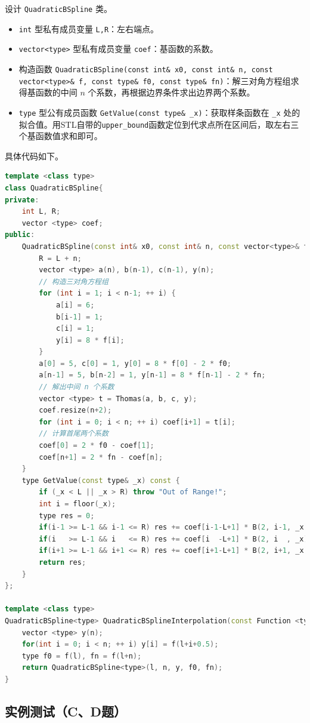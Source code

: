 \documentclass{ctexart}
\begin{document}
设计 \verb|QuadraticBSpline| 类。

\begin{itemize}
\item \verb|int| 型私有成员变量 \verb|L,R|：左右端点。
\item \verb|vector<type>| 型私有成员变量 \verb|coef|：基函数的系数。
\item 构造函数 \verb|QuadraticBSpline(const int& x0, const int& n, const vector<type>& f, const type& f0, const type& fn)|：解三对角方程组求得基函数的中间 $n$ 个系数，再根据边界条件求出边界两个系数。
\item \verb|type| 型公有成员函数 \verb|GetValue(const type& _x)|：获取样条函数在 \verb|_x| 处的拟合值。用STL自带的\verb|upper_bound|函数定位到代求点所在区间后，取左右三个基函数值求和即可。
\end{itemize}

具体代码如下。

\begin{lstlisting}[language={c++}]
template <class type>
class QuadraticBSpline{
private:
	int L, R;
	vector <type> coef;
public:
	QuadraticBSpline(const int& x0, const int& n, const vector<type>& f, const type& f0, const type& fn) : L(x0) {
		R = L + n;
		vector <type> a(n), b(n-1), c(n-1), y(n);
		// 构造三对角方程组
		for (int i = 1; i < n-1; ++ i) {
			a[i] = 6;
			b[i-1] = 1;
			c[i] = 1;
			y[i] = 8 * f[i];
		}
		a[0] = 5, c[0] = 1, y[0] = 8 * f[0] - 2 * f0;
		a[n-1] = 5, b[n-2] = 1, y[n-1] = 8 * f[n-1] - 2 * fn;
		// 解出中间 n 个系数
		vector <type> t = Thomas(a, b, c, y);
		coef.resize(n+2);
		for (int i = 0; i < n; ++ i) coef[i+1] = t[i];
		// 计算首尾两个系数
		coef[0] = 2 * f0 - coef[1];
		coef[n+1] = 2 * fn - coef[n];
	}
	type GetValue(const type& _x) const {
		if (_x < L || _x > R) throw "Out of Range!";
		int i = floor(_x);
		type res = 0;
		if(i-1 >= L-1 && i-1 <= R) res += coef[i-1-L+1] * B(2, i-1, _x);
		if(i   >= L-1 && i   <= R) res += coef[i  -L+1] * B(2, i  , _x);
		if(i+1 >= L-1 && i+1 <= R) res += coef[i+1-L+1] * B(2, i+1, _x);
		return res;
	}
};

template <class type>
QuadraticBSpline<type> QuadraticBSplineInterpolation(const Function <type>& f, const int& l, const int& n) {
	vector <type> y(n);
	for(int i = 0; i < n; ++ i) y[i] = f(l+i+0.5);
	type f0 = f(l), fn = f(l+n);
	return QuadraticBSpline<type>(l, n, y, f0, fn);
}
\end{lstlisting}

\subsection{实例测试（C、D题）}
\end{document}
